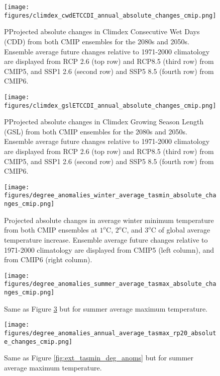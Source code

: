 \documentclass[]{scrartcl}
\begin{document}
\begin{appendices}
\begin{figure}[ht!]
	\centering
	\texttt{[image: figures/climdex\_cwdETCCDI\_annual\_absolute\_changes\_cmip.png]}
	\caption[CDD]{PProjected absolute changes in Climdex Consecutive Wet Days (CDD) from both CMIP ensembles for the 2080s and 2050s. Ensemble average future changes relative to 1971-2000 climatology are displayed from RCP 2.6 (top row) and RCP8.5 (third row) from CMIP5, and SSP1 2.6 (second row) and SSP5 8.5 (fourth row) from CMIP6.}
	\label{fig:climdex_cwd_future}
\end{figure}	

\begin{figure}[ht!]
	\centering
	\texttt{[image: figures/climdex\_gslETCCDI\_annual\_absolute\_changes\_cmip.png]}
	\caption[CDD]{PProjected absolute changes in Climdex Growing Season Length (GSL) from both CMIP ensembles for the 2080s and 2050s. Ensemble average future changes relative to 1971-2000 climatology are displayed from RCP 2.6 (top row) and RCP8.5 (third row) from CMIP5, and SSP1 2.6 (second row) and SSP5 8.5 (fourth row) from CMIP6.}
	\label{fig:climdex_gsl_future}
\end{figure}	
	
\begin{figure}[ht!]
	\centering
	\texttt{[image: figures/degree\_anomalies\_winter\_average\_tasmin\_absolute\_changes\_cmip.png]}
	\caption[Pr]{Projected absolute changes in average winter minimum temperature from both CMIP ensembles at $1^o$C, $2^o$C, and $3^o$C of global average temperature increase. Ensemble average future changes relative to 1971-2000 climatology are displayed from CMIP5 (left column), and from CMIP6 (right column).}
	\label{fig:win_tasmin_deg_anoms}
\end{figure}

\begin{figure}[ht!]
	\centering
	\texttt{[image: figures/degree\_anomalies\_summer\_average\_tasmax\_absolute\_changes\_cmip.png]}
	\caption[Pr]{Same as Figure \ref{fig:win_tasmin_deg_anoms} but for summer average maximum temperature.}
	\label{fig:sum_tasmax_deg_anoms}
\end{figure}




\begin{figure}[ht!]
	\centering
	\texttt{[image: figures/degree\_anomalies\_annual\_average\_tasmax\_rp20\_absolute\_changes\_cmip.png]}
	\caption[Tas]{Same as Figure \ref{fig:ext_tasmin_deg_anoms} but for summer average maximum temperature.}
	\label{fig:ext_tasmax_deg_anoms}
\end{figure}



\end{appendices}
\end{document}
